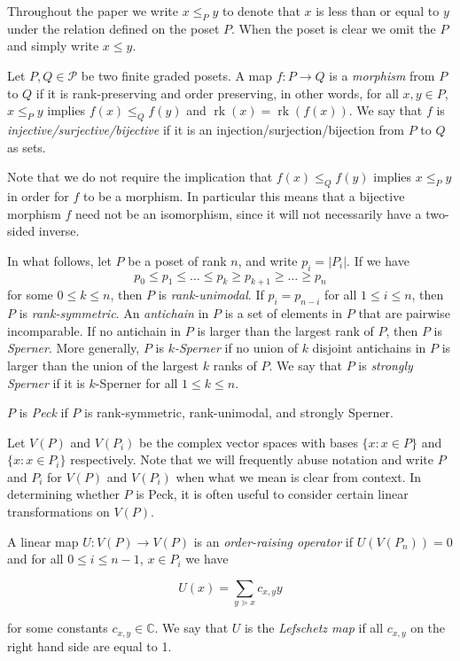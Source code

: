 \documentclass[smallextended]{svjour3}       %
\numberwithin{equation}{section}
\newcommand\rk{\operatorname{rk}}
\begin{document}
Throughout the paper we write $x\le_P y$ to denote that $x$ is less than or equal to $y$ under the relation defined on the poset $P$.  When the poset is clear we omit the $P$ and simply write $x\le y$.  

Let $P, Q \in \mathcal P$ be two finite graded posets.  A map $f\colon P\rightarrow Q$ is a \textit{morphism} from $P$ to $Q$ if it is rank-preserving and order preserving, in other words, for all $x,y\in P$, $x\le_P y $ implies $f(x)\le_Q f(y)$ and $\rk(x) = \rk(f(x))$.  We say that $f$ is \textit{injective/surjective/bijective} if it is an injection/surjection/bijection from $P$ to $Q$ as sets.

\begin{remark}\label{rem:bijective_morphism_not_isomorphism}
Note that we do not require the implication that $f(x)\le_Q f(y)$ implies $x\le_P y$ in order for $f$ to be a morphism.  In particular this means that a bijective morphism $f$ need not be an isomorphism, since it will not necessarily have a two-sided inverse.  
\end{remark}


In what follows, let $P$ be a poset of rank $n$, and write $p_i = |P_i|$.  If we have
$$p_0\le p_1\le \ldots \le p_k \ge p_{k+1} \ge\ldots \ge p_n$$
for some $0\le k\le n$, then $P$ is \textit{rank-unimodal}. If $p_i = p_{n-i}$ for all $1\le i\le n$, then $P$ is \textit{rank-symmetric}.  An \textit{antichain} in $P$ is a set of elements in $P$ that are pairwise incomparable.  If no antichain in $P$ is larger than the largest rank of $P$, then $P$ is \textit{Sperner}.  More generally, $P$ is \textit{$k$-Sperner} if no union of $k$ disjoint antichains in $P$ is larger than the union of the largest $k$ ranks of $P$. We say that $P$ is \textit{strongly Sperner} if it is $k$-Sperner for all $1\le k\le n$.

\begin{definition}
$P$ is \textit{Peck} if $P$ is rank-symmetric, rank-unimodal, and strongly Sperner.
\end{definition}


Let $V(P)$ and $V(P_i)$ be the complex vector spaces with bases $\{x :x\in P\}$ and $\{x :x\in P_i\}$ respectively.  Note that we will frequently abuse notation and write $P$ and $P_i$ for $V(P)$ and $V(P_i)$ when what we mean is clear from context.  In determining whether $P$ is Peck, it is often useful to consider certain linear transformations on $V(P)$.

\begin{definition}
\label{defn:lefschetz}
A linear map $U\colon V(P)\rightarrow V(P)$ is an \textit{order-raising operator} if $U(V(P_n)) = 0$ and for all $0\le i\le n-1$, $x\in P_i$ we have

$$U(x) = \sum_{y\gtrdot x} c_{x,y}y$$

\noindent for some constants $c_{x,y}\in \mathbb{C}$.  We say that $U$ is the \textit{Lefschetz map} if all $c_{x,y}$ on the right hand side are equal to 1.
\end{definition}
\end{document}
